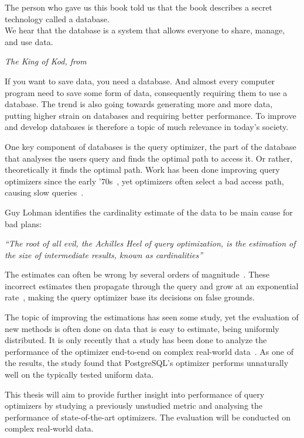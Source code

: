 \epigraph{The person who gave us this book told us that the book describes a
  secret technology called a database.\\
  We hear that the database is a system that allows everyone to share, manage, and
  use data.}{\textit{The King of Kod, from~\cite[p.
    6]{takahashi_2009_manga_tmgtd}}}

If you want to save data, you need a database. And almost every computer program
need to save some form of data, consequently requiring them to use a database.
The trend is also going towards generating more and more data, putting higher
strain on databases and requiring better performance. To improve and develop
databases is therefore a topic of much relevance in today's society.

One key component of databases is the query optimizer, the part of the database
that analyses the users query and finds the optimal path to access it. Or
rather, theoretically it finds the optimal path. Work has been done improving
query optimizers since the early '70s~\cite{chaudhuri_1998_overview_aooqoirs},
yet optimizers often select a bad access path, causing slow
queries~\cite{leis_2015_how_hgaqor}.

Guy Lohman identifies the cardinality estimate of the data to be main cause for bad plans:

\textit{``The root of all evil, the Achilles Heel of query optimization, is the
  estimation of the size of intermediate results, known as cardinalities''}

The estimates can often be wrong by several orders of
magnitude~\cite{lohman_query_iqoap}. These incorrect estimates then propagate
through the query and grow at an exponential
rate~\cite{ioannidis_1991_propagation_otpoeitsojr}, making the query optimizer
base its decisions on false grounds.

The topic of improving the estimations has seen some study, yet the evaluation
of new methods is often done on data that is easy to estimate, being uniformly
distributed. It is only recently that a study has been done to analyze the
performance of the optimizer end-to-end on complex real-world
data~\cite{leis_2015_how_hgaqor}. As one of the results, the study found that
PostgreSQL's optimizer performs unnaturally well on the typically tested uniform
data.

This thesis will aim to provide further insight into performance of
query optimizers by studying a previously unstudied metric and analysing the
performance of state-of-the-art optimizers. The evaluation will be conducted on
complex real-world data.

